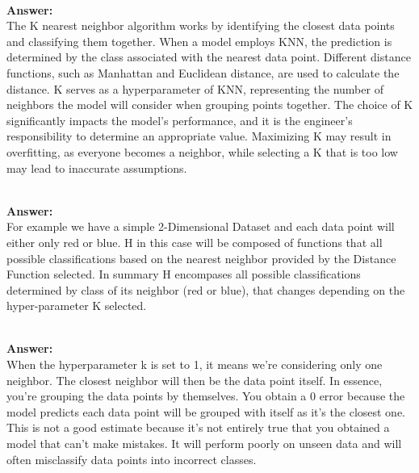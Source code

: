 \documentclass[12pt]{article}
\begin{document}

\begin{enumerate}

 \\
\textbf{Answer: } \\ 
The K nearest neighbor algorithm works by identifying the closest data points and classifying them together. When a model employs KNN, the prediction is determined by the class associated with the nearest data point. Different distance functions, such as Manhattan and Euclidean distance, are used to calculate the distance. K serves as a hyperparameter of KNN, representing the number of neighbors the model will consider when grouping points together. The choice of K significantly impacts the model's performance, and it is the engineer's responsibility to determine an appropriate value. Maximizing K may result in overfitting, as everyone becomes a neighbor, while selecting a K that is too low may lead to inaccurate assumptions. 

 \\ 
\textbf{Answer: } \\ 
For example we have a simple 2-Dimensional Dataset and each data point will either only red or blue. 
H in this case will be composed of functions that all possible classifications based on the nearest neighbor provided by the Distance Function selected. In summary H encompases all possible classifications determined by class of its neighbor (red or blue), that changes depending on the hyper-parameter K selected.

 \\
\textbf{Answer: } \\ 
When the hyperparameter k is set to 1, it means we're considering only one neighbor. The closest neighbor will then be the data point itself. In essence, you're grouping the data points by themselves. You obtain a 0 error because the model predicts each data point will be grouped with itself as it's the closest one. This is not a good estimate because it's not entirely true that you obtained a model that can't make mistakes. It will perform poorly on unseen data and will often misclassify data points into incorrect classes.


\end{enumerate}
\end{document}
